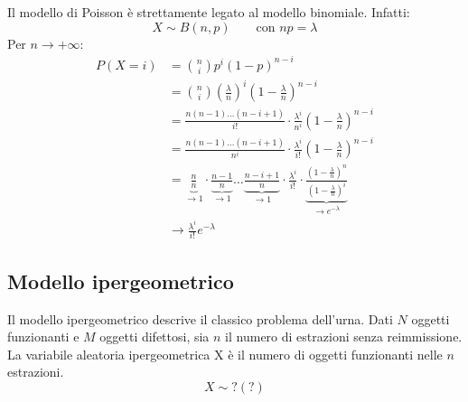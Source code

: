 Il modello di Poisson è strettamente legato al modello binomiale. Infatti:
\begin{equation*}
	X\sim B(n, p)\qquad\text{con }np=\lambda
\end{equation*}
Per $n\to+\infty$:
\begin{align*}
	P(X=i) & = \binom{n}{i} p^i (1-p)^{n-i}                                                                                                                                                                                                                                                \\
	       & = \binom{n}{i}\left(\frac{\lambda}{n}\right)^i\left(1-\frac{\lambda}{n}\right)^{n-i}                                                                                                                                                                                          \\
	       & = \frac{n(n-1) \dots (n-i+1)}{i!} \cdot \frac{\lambda^i}{n^i} \left( 1 - \frac{\lambda}{n} \right)^{n-i}                                                                                                                                                                      \\
	       & = \frac{n(n-1) \dots (n-i+1)}{n^i} \cdot \frac{\lambda^i}{i!} \left( 1 - \frac{\lambda}{n} \right)^{n-i}                                                                                                                                                                      \\
	       & = \underbrace{\frac{n}{n}}_{\to 1} \cdot \underbrace{\frac{n-1}{n}}_{\to 1} \dots \underbrace{\frac{n-i+1}{n}}_{\to 1} \cdot \frac{\lambda^i}{i!} \cdot \underbrace{\frac{\left( 1 - \frac{\lambda}{n} \right)^n}{\left( 1 - \frac{\lambda}{n} \right)^i}}_{\to e^{-\lambda}} \\
	       & \to \frac{\lambda^i}{i!} e^{-\lambda}
\end{align*}



\subsection{Modello ipergeometrico}
Il modello ipergeometrico descrive il classico problema dell'urna. Dati $N$ oggetti funzionanti e $M$ oggetti difettosi, sia $n$ il numero di estrazioni senza reimmissione. La variabile aleatoria ipergeometrica X è il numero di oggetti funzionanti nelle $n$ estrazioni.
\begin{equation*}
	X\sim ?(?)
\end{equation*}

